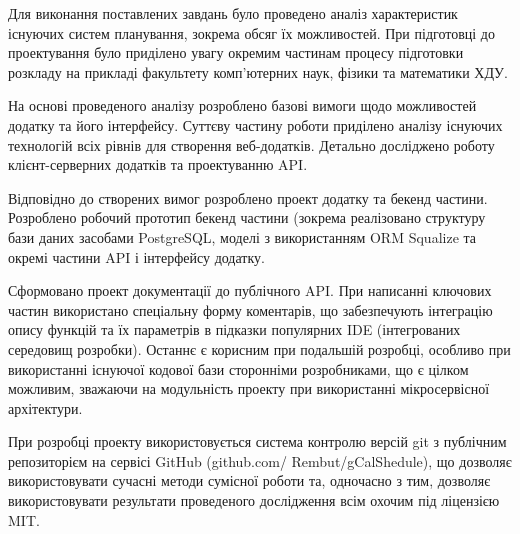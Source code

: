 
Для виконання поставлених завдань було проведено аналіз характеристик існуючих систем планування, зокрема обсяг їх можливостей. При підготовці до проектування було приділено увагу окремим частинам процесу підготовки розкладу на прикладі факультету комп’ютерних наук, фізики та математики ХДУ.

На основі проведеного аналізу розроблено базові вимоги щодо можливостей додатку та його інтерфейсу.
Суттєву частину роботи приділено аналізу існуючих технологій всіх рівнів для створення веб-додатків. Детально досліджено роботу клієнт-серверних додатків та проектуванню API. 

Відповідно до створених вимог розроблено проект додатку та бекенд частини. Розроблено робочий прототип бекенд частини (зокрема реалізовано структуру бази даних засобами PostgreSQL, моделі з використанням ORM Squalize та окремі частини API і інтерфейсу додатку.

Сформовано проект документації до публічного API. При написанні ключових частин використано спеціальну форму коментарів, що забезпечують інтеграцію опису функцій та їх параметрів в підказки популярних IDE (інтегрованих середовищ розробки). Останнє є корисним при подальшій розробці, особливо при використанні існуючої кодової бази сторонніми розробниками, що є цілком можливим, зважаючи на модульність проекту при використанні мікросервісної архітектури.

При розробці проекту використовується система контролю версій git з публічним репозиторієм на сервісі GitHub (github.com/ Rembut/gCalShedule), що дозволяє використовувати сучасні методи сумісної роботи та, одночасно з тим, дозволяє використовувати результати проведеного дослідження всім охочим під ліцензією MIT.
